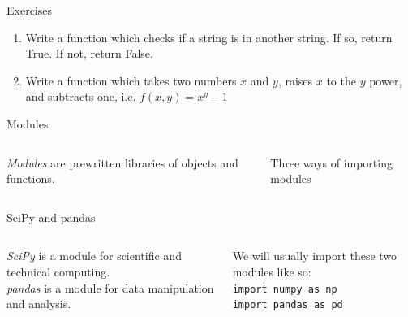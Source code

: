 \documentclass{beamer}
\begin{document}
\begin{frame}{Exercises}
    \begin{enumerate}
        \item Write a function which checks if a string is in another string. If so, return True. If not, return False.
        \item Write a function which takes two numbers $x$ and $y$, raises $x$ to the $y$ power, and subtracts one, i.e. $f(x, y) = x^y - 1$ 
    \end{enumerate}
\end{frame}

\begin{frame}{Modules}
    \begin{columns}
        \begin{column}{0.4\textwidth}
            \textit{Modules} are prewritten libraries of objects and functions.
        \end{column}
        \begin{column}{0.6\textwidth}
        Three ways of importing modules
        \small
\begin{block}{}
\begin{semiverbatim}

    \vspace*{0.5em}


    \vspace*{0.5em}

\end{semiverbatim}
\end{block}  
        \end{column}
    \end{columns}
\end{frame}

\begin{frame}{SciPy and pandas}
    \begin{columns}
        \begin{column}{0.5\textwidth}
            \textit{SciPy} is a module for scientific and technical computing. \\
            \vspace*{0.5em}
            \textit{pandas} is a module for data manipulation and analysis.
        \end{column}
        \begin{column}{0.5\textwidth}
        \small
        We will usually import these two modules like so: \\
        \vspace*{0.5em}
        \texttt{import numpy as np} \\
        \texttt{import pandas as pd}
        \end{column}
    \end{columns}
\end{frame}
\end{document}
